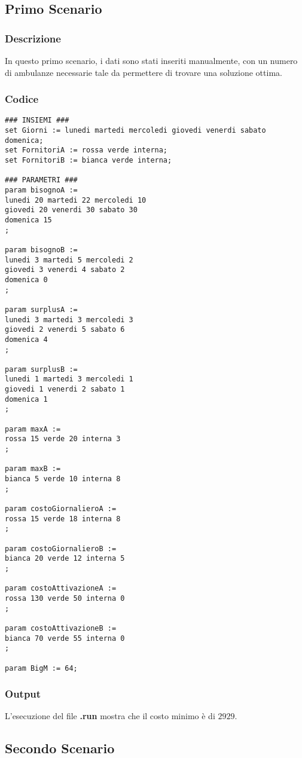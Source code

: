 \subsection{Primo Scenario}
\subsubsection{Descrizione}
In questo primo scenario, i dati sono stati inseriti manualmente, con un numero di ambulanze necessarie tale da permettere di trovare una soluzione ottima.
\subsubsection{Codice}
\begin{lstlisting}
### INSIEMI ###
set Giorni := lunedi martedi mercoledi giovedi venerdi sabato domenica;
set FornitoriA := rossa verde interna;
set FornitoriB := bianca verde interna;

### PARAMETRI ###
param bisognoA := 
lunedi 20 martedi 22 mercoledi 10 
giovedi 20 venerdi 30 sabato 30
domenica 15
;

param bisognoB := 
lunedi 3 martedi 5 mercoledi 2
giovedi 3 venerdi 4 sabato 2
domenica 0
;

param surplusA :=
lunedi 3 martedi 3 mercoledi 3
giovedi 2 venerdi 5 sabato 6
domenica 4
;

param surplusB :=
lunedi 1 martedi 3 mercoledi 1
giovedi 1 venerdi 2 sabato 1
domenica 1
;

param maxA :=
rossa 15 verde 20 interna 3
;

param maxB :=
bianca 5 verde 10 interna 8
;

param costoGiornalieroA :=
rossa 15 verde 18 interna 8
;

param costoGiornalieroB :=
bianca 20 verde 12 interna 5
;

param costoAttivazioneA :=
rossa 130 verde 50 interna 0
;

param costoAttivazioneB :=
bianca 70 verde 55 interna 0
; 

param BigM := 64;
\end{lstlisting}
\subsubsection{Output}
L'esecuzione del file \textbf{.run} mostra che il costo minimo è di \texteuro$2929$.

\subsection{Secondo Scenario}
